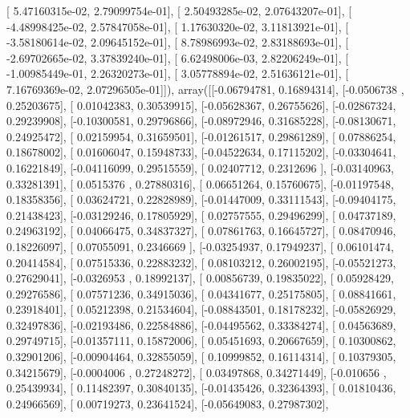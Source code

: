 \documentclass{article}
\begin{document}
       [  5.47160315e-02,   2.79099754e-01],
       [  2.50493285e-02,   2.07643207e-01],
       [ -4.48998425e-02,   2.57847058e-01],
       [  1.17630320e-02,   3.11813921e-01],
       [ -3.58180614e-02,   2.09645152e-01],
       [  8.78986993e-02,   2.83188693e-01],
       [ -2.69702665e-02,   3.37839240e-01],
       [  6.62498006e-03,   2.82206249e-01],
       [ -1.00985449e-01,   2.26320273e-01],
       [  3.05778894e-02,   2.51636121e-01],
       [  7.16769369e-02,   2.07296505e-01]]), array([[-0.06794781,  0.16894314],
       [-0.0506738 ,  0.25203675],
       [ 0.01042383,  0.30539915],
       [-0.05628367,  0.26755626],
       [-0.02867324,  0.29239908],
       [-0.10300581,  0.29796866],
       [-0.08972946,  0.31685228],
       [-0.08130671,  0.24925472],
       [ 0.02159954,  0.31659501],
       [-0.01261517,  0.29861289],
       [ 0.07886254,  0.18678002],
       [ 0.01606047,  0.15948733],
       [-0.04522634,  0.17115202],
       [-0.03304641,  0.16221849],
       [-0.04116099,  0.29515559],
       [ 0.02407712,  0.2312696 ],
       [-0.03140963,  0.33281391],
       [ 0.0515376 ,  0.27880316],
       [ 0.06651264,  0.15760675],
       [-0.01197548,  0.18358356],
       [ 0.03624721,  0.22828989],
       [-0.01447009,  0.33111543],
       [-0.09404175,  0.21438423],
       [-0.03129246,  0.17805929],
       [ 0.02757555,  0.29496299],
       [ 0.04737189,  0.24963192],
       [ 0.04066475,  0.34837327],
       [ 0.07861763,  0.16645727],
       [ 0.08470946,  0.18226097],
       [ 0.07055091,  0.2346669 ],
       [-0.03254937,  0.17949237],
       [ 0.06101474,  0.20414584],
       [ 0.07515336,  0.22883232],
       [ 0.08103212,  0.26002195],
       [-0.05521273,  0.27629041],
       [-0.0326953 ,  0.18992137],
       [ 0.00856739,  0.19835022],
       [ 0.05928429,  0.29276586],
       [ 0.07571236,  0.34915036],
       [ 0.04341677,  0.25175805],
       [ 0.08841661,  0.23918401],
       [ 0.05212398,  0.21534604],
       [-0.08843501,  0.18178232],
       [-0.05826929,  0.32497836],
       [-0.02193486,  0.22584886],
       [-0.04495562,  0.33384274],
       [ 0.04563689,  0.29749715],
       [-0.01357111,  0.15872006],
       [ 0.05451693,  0.20667659],
       [ 0.10300862,  0.32901206],
       [-0.00904464,  0.32855059],
       [ 0.10999852,  0.16114314],
       [ 0.10379305,  0.34215679],
       [-0.0004006 ,  0.27248272],
       [ 0.03497868,  0.34271449],
       [-0.010656  ,  0.25439934],
       [ 0.11482397,  0.30840135],
       [-0.01435426,  0.32364393],
       [ 0.01810436,  0.24966569],
       [ 0.00719273,  0.23641524],
       [-0.05649083,  0.27987302],
\end{document}
